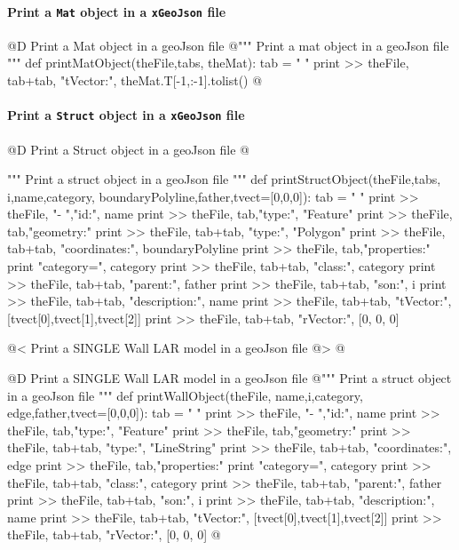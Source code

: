 \documentclass[11pt,oneside]{article}	%
\begin{document}
\paragraph{Print a \texttt{Mat} object in a \texttt{xGeoJson} file}

@D Print a Mat object in a geoJson file
@{""" Print a mat object in a geoJson file """
def printMatObject(theFile,tabs, theMat):
	tab = "	"
	print >> theFile, tab+tab, "tVector:", theMat.T[-1,:-1].tolist()
@}

\paragraph{Print a \texttt{Struct} object in a \texttt{xGeoJson} file}

@D Print a Struct object in a geoJson file
@{""" Print a struct object in a geoJson file """
def printStructObject(theFile,tabs, i,name,category, boundaryPolyline,father,tvect=[0,0,0]):
	tab = "	"
	print >> theFile, "-   ","id:", name
	print >> theFile, tab,"type:", "Feature"
	print >> theFile, tab,"geometry:" 
	print >> theFile, tab+tab, "type:", "Polygon"
	print >> theFile, tab+tab, "coordinates:", boundaryPolyline
	print >> theFile, tab,"properties:"
	print "category=", category
	print >> theFile, tab+tab, "class:", category
	print >> theFile, tab+tab, "parent:", father
	print >> theFile, tab+tab, "son:", i
	print >> theFile, tab+tab, "description:", name
	print >> theFile, tab+tab, "tVector:", [tvect[0],tvect[1],tvect[2]]
	print >> theFile, tab+tab, "rVector:", [0, 0, 0]
	
@< Print a SINGLE Wall LAR model  in a geoJson file @>
@}

@D Print a SINGLE Wall LAR model  in a geoJson file
@{""" Print a struct object in a geoJson file """
def printWallObject(theFile, name,i,category, edge,father,tvect=[0,0,0]):
	tab = "	"
	print >> theFile, "-   ","id:", name
	print >> theFile, tab,"type:", "Feature"
	print >> theFile, tab,"geometry:" 
	print >> theFile, tab+tab, "type:", "LineString"
	print >> theFile, tab+tab, "coordinates:", edge
	print >> theFile, tab,"properties:"
	print "category=", category
	print >> theFile, tab+tab, "class:", category
	print >> theFile, tab+tab, "parent:", father
	print >> theFile, tab+tab, "son:", i
	print >> theFile, tab+tab, "description:", name
	print >> theFile, tab+tab, "tVector:", [tvect[0],tvect[1],tvect[2]]
	print >> theFile, tab+tab, "rVector:", [0, 0, 0]
@}
\end{document}
